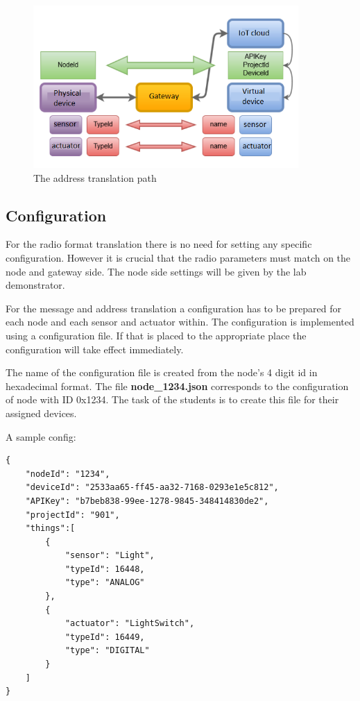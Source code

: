 \documentclass[a4paper]{article}
\begin{document}
\begin{figure}[H]
    \centering
    \includegraphics[width=0.9\textwidth]{figures/gateway-addresstranslation.png}
    \caption{The address translation path}
    \label{fig:gateway-addrtransl}
\end{figure}

\subsection{Configuration}

For the radio format translation there is no need for setting any specific configuration.
However it is crucial that the radio parameters must match on the node and gateway side.
The node side settings will be given by the lab demonstrator.

For the message and address translation a configuration has to be prepared for each node 
and each sensor and actuator within. The configuration is implemented using a configuration
file. If that is placed to the appropriate place the configuration will take effect immediately.

The name of the configuration file is created from the node's 4 digit id in hexadecimal format.
The file \textbf{node\_1234.json} corresponds to the configuration of node with ID 0x1234. The
task of the students is to create this file for their assigned devices.

A sample config:
\begin{verbatim}
{
    "nodeId": "1234",
    "deviceId": "2533aa65-ff45-aa32-7168-0293e1e5c812",
    "APIKey": "b7beb838-99ee-1278-9845-348414830de2",
    "projectId": "901",
    "things":[
        {
            "sensor": "Light",
            "typeId": 16448,
            "type": "ANALOG"
        },
        {
            "actuator": "LightSwitch",
            "typeId": 16449,
            "type": "DIGITAL"
        }
    ]
}
\end{verbatim} 
\end{document}
